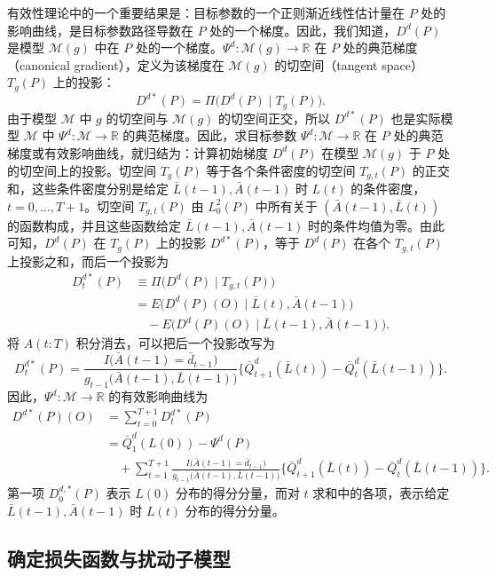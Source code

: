 有效性理论中的一个重要结果是：目标参数的一个正则渐近线性估计量在 $P$ 处的影响曲线，是目标参数路径导数在 $P$ 处的一个梯度。因此，我们知道，$D^d(P)$ 是模型 $\mathcal M(g)$ 中在 $P$ 处的一个梯度。$\Psi^d:\mathcal M(g)\to\mathbb R$ 在 $P$ 处的典范梯度（canonical gradient），定义为该梯度在 $\mathcal M(g)$ 的切空间（tangent space）$T_g(P)$ 上的投影：
\[
 D^{d*}(P)=\Pi\bigl(D^d(P)\mid T_g(P)\bigr).
\]
由于模型 $\mathcal M$ 中 $g$ 的切空间与 $\mathcal M(g)$ 的切空间正交，所以 $D^{d*}(P)$ 也是实际模型 $\mathcal M$ 中 $\Psi^d:\mathcal M\to\mathbb R$ 的典范梯度。因此，求目标参数 $\Psi^d:\mathcal M\to\mathbb R$ 在 $P$ 处的典范梯度或有效影响曲线，就归结为：计算初始梯度 $D^d(P)$ 在模型 $\mathcal M(g)$ 于 $P$ 处的切空间上的投影。切空间 $T_g(P)$ 等于各个条件密度的切空间 $T_{g,t}(P)$ 的正交和，这些条件密度分别是给定 $\bar L(t-1),\bar A(t-1)$ 时 $L(t)$ 的条件密度，$t=0,\ldots,T+1$。切空间 $T_{g,t}(P)$ 由 $L_0^2(P)$ 中所有关于 $(\bar A(t-1),\bar L(t))$ 的函数构成，并且这些函数给定 $\bar L(t-1),\bar A(t-1)$ 时的条件均值为零。由此可知，$D^d(P)$ 在 $T_g(P)$ 上的投影 $D^{d*}(P)$，等于 $D^d(P)$ 在各个 $T_{g,t}(P)$ 上投影之和，而后一个投影为
\[
 \begin{aligned}
 D_t^{d*}(P)
 &\equiv\Pi\bigl(D^d(P)\mid T_{g,t}(P)\bigr)\\
 &=E\bigl(D^d(P)(O)\mid\bar L(t),\bar A(t-1)\bigr)\\
 &\quad{}-E\bigl(D^d(P)(O)\mid\bar L(t-1),\bar A(t-1)\bigr).
 \end{aligned}
\]
将 $A(t:T)$ 积分消去，可以把后一个投影改写为
\[
 D_t^{d*}(P)
 =\frac{I\bigl(\bar A(t-1)=\bar d_{t-1}\bigr)}
        {g_{t-1}\bigl(\bar A(t-1),\bar L(t-1)\bigr)}
  \bigl\{\bar Q_{t+1}^d(\bar L(t))-\bar Q_t^d(\bar L(t-1))\bigr\}.
\]
因此，$\Psi^d:\mathcal M\to\mathbb R$ 的有效影响曲线为
\[
 \begin{aligned}
 D^{d*}(P)(O)
 &=\sum_{t=0}^{T+1}D_t^{d*}(P)\\
 &=\bar Q_1^d(L(0))-\Psi^d(P)\\
 &\quad{}+\sum_{t=1}^{T+1}
 \frac{I\bigl(\bar A(t-1)=\bar d_{t-1}\bigr)}
      {g_{t-1}\bigl(\bar A(t-1),\bar L(t-1)\bigr)}
 \bigl\{\bar Q_{t+1}^d(\bar L(t))-\bar Q_t^d(\bar L(t-1))\bigr\}.
 \end{aligned}
\]
第一项 $D_0^{d,*}(P)$ 表示 $L(0)$ 分布的得分分量，而对 $t$ 求和中的各项，表示给定 $\bar L(t-1),\bar A(t-1)$ 时 $L(t)$ 分布的得分分量。

\subsection{确定损失函数与扰动子模型}
\label{subsec:ch04-loss-submodel}

